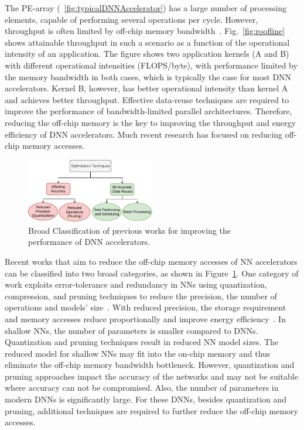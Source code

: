 \documentclass[a4paper,10pt]{article}
\begin{document}
The PE-array (\figurename{~\ref{fig:typicalDNNAccelerator}}) has a large number of processing elements, capable of performing several operations per cycle. However, throughput is often limited by off-chip memory bandwidth~\cite{williams2009roofline}. Fig.~\ref{fig:roofline} shows attainable throughput in such a scenario as a function of the operational intensity of an application. The figure shows two application kernels (A and B) with different operational intensities (FLOPS/byte), with performance limited by the memory bandwidth in both cases, which is typically the case for most DNN accelerators. Kernel B, however, has better operational intensity than kernel A and achieves better throughput. Effective data-reuse techniques are required to improve the performance of bandwidth-limited parallel architectures. Therefore, reducing the off-chip memory is the key to improving the throughput and energy efficiency of DNN accelerators. Much recent research has focused on reducing off-chip memory accesses.
\begin{figure}[!htb]
	\centering
    \captionsetup{font=sf}
	\includegraphics[width=0.5\textwidth]{previousWorkClassification}
	\caption{Broad Classification of previous works for improving the performance of DNN accelerators.}
	\label{fig:previousWorkClassification}
\end{figure}

Recent works that aim to reduce the off-chip memory accesses of NN accelerators can be classified into two broad categories, as shown in Figure~\ref{fig:previousWorkClassification}. One category of work exploits error-tolerance and redundancy in NNs using quantization, compression, and pruning techniques to reduce the precision, the number of operations and models' size~\cite{ferreira2016fpga,wang2018c,chang2015recurrent,han2017ese,lee2016fpga}. With reduced precision, the storage requirement and memory accesses reduce proportionally and improve energy efficiency~\cite{sze2017efficient}. In shallow NNs, the number of parameters is smaller compared to DNNs. Quantization and pruning techniques result in reduced NN model sizes. The reduced model for shallow NNs may fit into the on-chip memory and thus eliminate the off-chip memory bandwidth bottleneck. However, quantization and pruning approaches impact the accuracy of the networks and may not be suitable where accuracy can not be compromised. Also, the number of parameters in modern DNNs is significantly large. For these DNNs, besides quantization and pruning, additional techniques are required to further reduce the off-chip memory accesses.
\end{document}

